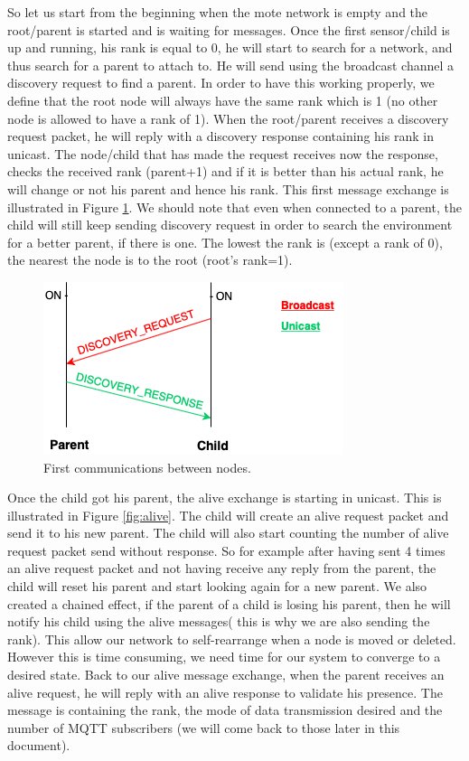 \documentclass[a4paper,10pt]{article}
\begin{document}
So let us start from the beginning when the mote network is empty and the root/parent is started and is waiting for messages. Once the first sensor/child is up and running, his rank is equal to 0, he will start to search for a network, and thus search for a parent to attach to. He will send using the broadcast channel a discovery request to find a parent. In order to have this working properly, we define that the root node will always have the same rank which is 1 (no other node is allowed to have a rank of 1). When the root/parent receives a discovery request packet, he will reply with a discovery response containing his rank in unicast. The node/child that has made the request receives now the response, checks the received rank (parent+1) and if it is better than his actual rank, he will change or not his parent and hence his rank. This first message exchange is illustrated in Figure \ref{fig:bd}. We should note that even when connected to a parent, the child will still keep sending discovery request in order to search the environment for a better parent, if there is one. The lowest the rank is (except a rank of 0), the nearest the node is to the root (root's rank=1).\\

\begin{figure}[!htb]
\centering
\includegraphics[scale=0.6]{./img/discovery.png}
\caption{First communications between nodes.}
\label{fig:bd}
\end{figure}

Once the child got his parent, the alive exchange is starting in unicast. This is illustrated in Figure \ref{fig:alive}. The child will create an alive request packet and send it to his new parent. The child will also start counting the number of alive request packet send without response. So for example after having sent 4 times an alive request packet and not having receive any reply from the parent, the child will reset his parent and start looking again for a new parent. We also created a chained effect, if the parent of a child is losing his parent, then he will notify his child using the alive messages( this is why we are also sending the rank). This allow our network to self-rearrange when a node is moved or deleted.  However this is time consuming, we need time for our system to converge to a desired state. Back to our alive message exchange, when the parent receives an alive request, he will reply with an alive response to validate his presence. The message is containing the rank, the mode of data transmission desired and the number of MQTT subscribers (we will come back to those later in this document).\\
\end{document}
